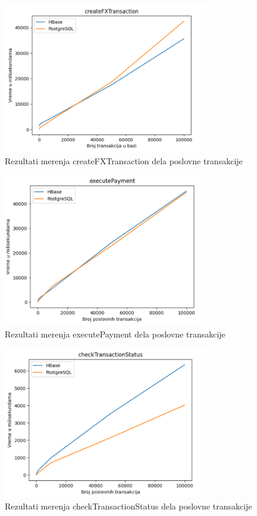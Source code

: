 \documentclass[12pt,oneside]{memoir}
\begin{document}
\begin{figure}[!ht]
  \centering
  \includegraphics[width=0.8\textwidth]{createFxTransaction-vizualization.png}
  \caption{Rezultati merenja createFXTransaction dela poslovne transakcije}
  \label{fig:grafikon}
\end{figure}

\pagebreak 
\begin{figure}[!ht]
  \centering
  \includegraphics[width=0.8\textwidth]{executePayment-vizualization.png}
  \caption{Rezultati merenja executePayment dela poslovne transakcije}
  \label{fig:grafikon}
\end{figure}

\begin{figure}[!ht]
  \centering
  \includegraphics[width=0.8\textwidth]{checkTransactionStatus-vizualization.png}
  \caption{Rezultati merenja checkTransactionStatus dela poslovne transakcije}
  \label{fig:grafikon}
\end{figure}
\end{document}
